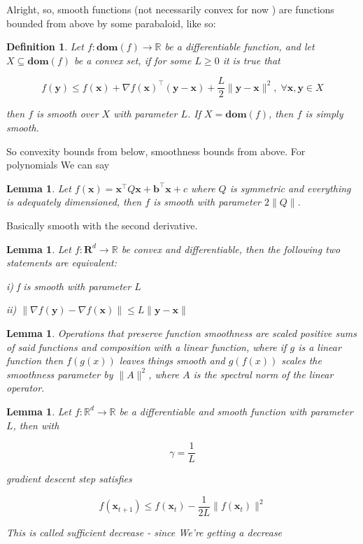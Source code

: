 \documentclass{article}
\newtheorem{definition}[theorem]{Definition}
\newtheorem{lemma}[theorem]{Lemma}
\begin{document}
	Alright, so, smooth functions (not necessarily convex for now ) are functions bounded from above by some parabaloid, like so:
	
	\begin{definition}
		Let $f:\mathbf{dom}(f)\to\mathbb{R}$ be a differentiable function, and let $X\subseteq\mathbf{dom}(f)$ be a convex set, if for some $L\ge 0$ it is true that
		
		\[ f(\mathbf{y}) \le f(\mathbf{x}) + \nabla f(\mathbf{x})^\top(\mathbf{y-x}) + \frac{L}{2} \|\mathbf{y-x}\|^2,\;\forall \mathbf{x, y}\in X \]
		
		then $f$ is smooth over $X$ with parameter $L$. If $X=\mathbf{dom}(f)$, then $f$ is simply smooth.
	\end{definition}

	So convexity bounds from below, smoothness bounds from above. For polynomials We can say
	
	\begin{lemma}
		Let $f(\mathbf{x}) = \mathbf{x}^\top Q \mathbf{x} + \mathbf{b^\top x} + c$ where $Q$ is symmetric and everything is adequately dimensioned, then $f$ is smooth with parameter $2\|Q\|$.
	\end{lemma}
	
	Basically smooth with the second derivative.
	
	\begin{lemma}
		Let $f:\mathbf{R}^d\to\mathbb{R}$ be convex and differentiable, then the following two statements are equivalent:
		
		i) f is smooth with parameter $L$
		
		ii) $\| \nabla f(\mathbf{y}) - \nabla f(\mathbf{x}) \| \le L \|\mathbf{y-x}\|$
	\end{lemma}

	\begin{lemma}
		Operations that preserve function smoothness are scaled positive sums of said functions and composition with a linear function, where if $g$ is a linear function then $f(g(x))$ leaves things smooth and $g(f(x))$ scales the smoothness parameter by $\|A\|^2$, where $A$ is the spectral norm of the linear operator.
	\end{lemma} 

	\begin{lemma}
		Let $f:\mathbb{R}^d\to\mathbb{R}$ be a differentiable and smooth function with parameter $L$, then with
		
		\[ \gamma = \frac{1}{L} \]
		
		gradient descent step satisfies
		
		\[ f(\mathbf{x}_{t+1}) \le f(\mathbf{x}_t) - \frac{1}{2L}\|f(\mathbf{x}_t)\|^2 \]
		
		This is called sufficient decrease - since We're getting a decrease 
	\end{lemma}
	
\end{document}

